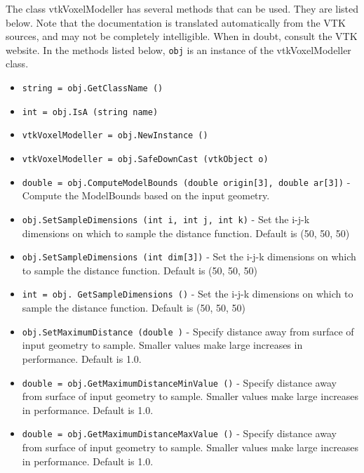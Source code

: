 The class vtkVoxelModeller has several methods that can be used.
  They are listed below.
Note that the documentation is translated automatically from the VTK sources,
and may not be completely intelligible.  When in doubt, consult the VTK website.
In the methods listed below, \verb|obj| is an instance of the vtkVoxelModeller class.
\begin{itemize}
\item  \verb|string = obj.GetClassName ()|

\item  \verb|int = obj.IsA (string name)|

\item  \verb|vtkVoxelModeller = obj.NewInstance ()|

\item  \verb|vtkVoxelModeller = obj.SafeDownCast (vtkObject o)|

\item  \verb|double = obj.ComputeModelBounds (double origin[3], double ar[3])| -  Compute the ModelBounds based on the input geometry.

\item  \verb|obj.SetSampleDimensions (int i, int j, int k)| -  Set the i-j-k dimensions on which to sample the distance function.
 Default is (50, 50, 50)

\item  \verb|obj.SetSampleDimensions (int dim[3])| -  Set the i-j-k dimensions on which to sample the distance function.
 Default is (50, 50, 50)

\item  \verb|int = obj. GetSampleDimensions ()| -  Set the i-j-k dimensions on which to sample the distance function.
 Default is (50, 50, 50)

\item  \verb|obj.SetMaximumDistance (double )| -  Specify distance away from surface of input geometry to sample. Smaller
 values make large increases in performance. Default is 1.0.

\item  \verb|double = obj.GetMaximumDistanceMinValue ()| -  Specify distance away from surface of input geometry to sample. Smaller
 values make large increases in performance. Default is 1.0.

\item  \verb|double = obj.GetMaximumDistanceMaxValue ()| -  Specify distance away from surface of input geometry to sample. Smaller
 values make large increases in performance. Default is 1.0.


\end{itemize}
